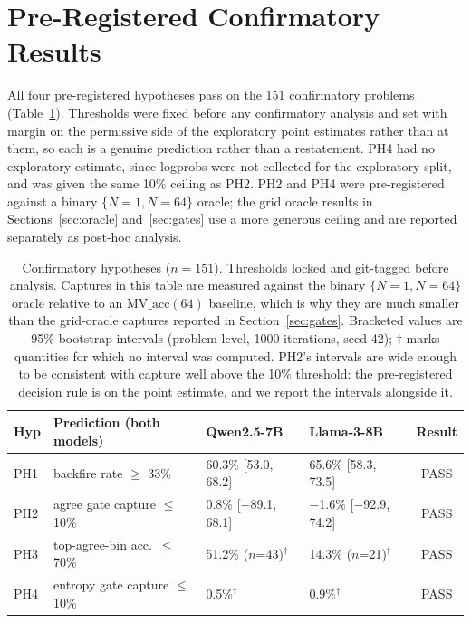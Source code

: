 \documentclass{article}
\begin{document}
\section{Pre-Registered Confirmatory Results}

All four pre-registered hypotheses pass on the 151 confirmatory problems
(Table~\ref{tab:confirmatory}). Thresholds were fixed before any confirmatory
analysis and set with margin on the permissive side of the exploratory point
estimates rather than at them, so each is a genuine prediction rather than a
restatement. PH4 had no exploratory estimate, since logprobs were not collected
for the exploratory split, and was given the same 10\% ceiling as PH2.
PH2 and PH4 were pre-registered against a binary $\{N=1, N=64\}$ oracle; the
grid oracle results in Sections~\ref{sec:oracle} and~\ref{sec:gates} use a
more generous ceiling and are reported separately as post-hoc analysis.

\begin{table}[t]
\begin{center}
\begin{tabular}{llllc}
\toprule
\textbf{Hyp} & \textbf{Prediction (both models)} & \textbf{Qwen2.5-7B} & \textbf{Llama-3-8B} & \textbf{Result} \\
\midrule
PH1 & backfire rate $\geq$ 33\%          & 60.3\% [53.0, 68.2] & 65.6\% [58.3, 73.5] & PASS \\
PH2 & agree gate capture $\leq$ 10\%   & 0.8\% [$-$89.1, 68.1] & $-$1.6\% [$-$92.9, 74.2] & PASS \\
PH3 & top-agree-bin acc.\ $\leq$ 70\%  & 51.2\% ($n$=43)$^{\dagger}$ & 14.3\% ($n$=21)$^{\dagger}$ & PASS \\
PH4 & entropy gate capture $\leq$ 10\% & 0.5\%$^{\dagger}$    & 0.9\%$^{\dagger}$      & PASS \\
\bottomrule
\end{tabular}
\end{center}
\caption{Confirmatory hypotheses ($n=151$). Thresholds locked and git-tagged
before analysis. Captures in this table are measured against the binary
$\{N=1, N=64\}$ oracle relative to an $\text{MV\_acc}(64)$ baseline, which is
why they are much smaller than the grid-oracle captures reported in
Section~\ref{sec:gates}. Bracketed values are 95\% bootstrap intervals
(problem-level, 1000 iterations, seed 42); $\dagger$ marks quantities for which
no interval was computed. PH2's intervals are wide enough to be consistent with
capture well above the 10\% threshold: the pre-registered decision rule is on
the point estimate, and we report the intervals alongside it.}
\label{tab:confirmatory}
\end{table}
\end{document}
